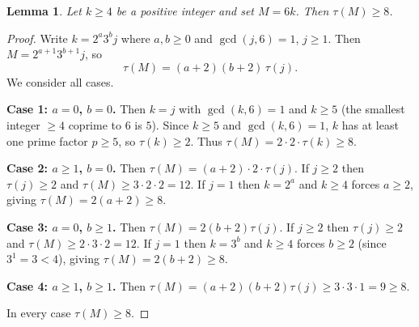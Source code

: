 \documentclass[a4paper]{amsart}
\newtheorem{lemma}[theorem]{Lemma}
\theoremstyle{definition}
\begin{document}
\begin{lemma}
\label{lem:tau6k}
Let $k \geq 4$ be a positive integer and set $M = 6k$. Then $\tau(M) \geq 8$.
\end{lemma}

\begin{proof}
Write $k = 2^a 3^b j$ where $a, b \geq 0$ and $\gcd(j, 6) = 1$, $j \geq 1$.
Then $M = 2^{a+1} 3^{b+1} j$, so
\[
\tau(M) = (a+2)(b+2)\,\tau(j).
\]
We consider all cases.

\textbf{Case 1: $a = 0$, $b = 0$.}
Then $k = j$ with $\gcd(k,6)=1$ and $k \geq 5$ (the smallest integer $\geq 4$ coprime to $6$ is $5$).
Since $k \geq 5$ and $\gcd(k,6)=1$, $k$ has at least one prime factor $p \geq 5$, so $\tau(k) \geq 2$.
Thus $\tau(M) = 2 \cdot 2 \cdot \tau(k) \geq 8$.

\textbf{Case 2: $a \geq 1$, $b = 0$.}
Then $\tau(M) = (a+2) \cdot 2 \cdot \tau(j)$.
If $j \geq 2$ then $\tau(j) \geq 2$ and $\tau(M) \geq 3 \cdot 2 \cdot 2 = 12$.
If $j = 1$ then $k = 2^a$ and $k \geq 4$ forces $a \geq 2$, giving $\tau(M) = 2(a+2) \geq 8$.

\textbf{Case 3: $a = 0$, $b \geq 1$.}
Then $\tau(M) = 2(b+2)\tau(j)$.
If $j \geq 2$ then $\tau(j) \geq 2$ and $\tau(M) \geq 2 \cdot 3 \cdot 2 = 12$.
If $j = 1$ then $k = 3^b$ and $k \geq 4$ forces $b \geq 2$ (since $3^1 = 3 < 4$),
giving $\tau(M) = 2(b+2) \geq 8$.

\textbf{Case 4: $a \geq 1$, $b \geq 1$.}
Then $\tau(M) = (a+2)(b+2)\tau(j) \geq 3 \cdot 3 \cdot 1 = 9 \geq 8$.

In every case $\tau(M) \geq 8$.
\end{proof}
\end{document}
